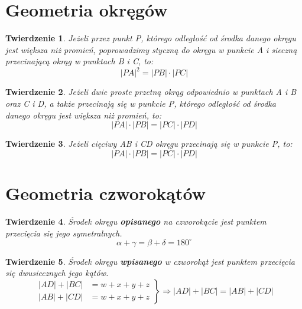 \documentclass{report}
\newtheorem{theorem}{Twierdzenie}
\begin{document}
    \section{Geometria okręgów}
      \begin{theorem}
        Jeżeli przez punkt P, którego odległość od środka danego okręgu jest większa niż promień, poprowadzimy styczną do okręgu w punkcie A i sieczną przecinającą okrąg w punktach B i C, to:
        \begin{equation}
          |PA|^2 = |PB| \cdot |PC|
        \end{equation}
      \end{theorem}
      \begin{theorem}
        Jeżeli dwie proste przetną okrąg odpowiednio w punktach A i B oraz C i D, a także przecinają się w punkcie P, którego odległość od środka danego okręgu jest większa niż promień, to:
        \begin{equation}
          |PA| \cdot |PB| = |PC| \cdot |PD|
        \end{equation}
      \end{theorem}
      \begin{theorem}
        Jeżeli cięciwy AB i CD okręgu przecinają się w punkcie P, to:
        \begin{equation}
          |PA| \cdot |PB| = |PC| \cdot |PD|
        \end{equation}
      \end{theorem}
    \section{Geometria czworokątów}
      \begin{theorem}
        Środek okręgu \textbf{opisanego} na czworokącie jest punktem przecięcia się jego symetralnych.
        \begin{equation}
          \alpha + \gamma = \beta + \delta = 180^\circ
        \end{equation}
      \end{theorem}
      \begin{theorem}
        Środek okręgu \textbf{wpisanego} w czworokąt jest punktem przecięcia się dwusiecznych jego kątów.
        \begin{equation}
          \left.
            \begin{aligned}
              |AD| + |BC| &= w+x+y+z\\
              |AB| + |CD| &= w+x+y+z
            \end{aligned}
          \right\}
          \Rightarrow |AD| + |BC| = |AB| + |CD|
        \end{equation}
      \end{theorem}
\end{document}
